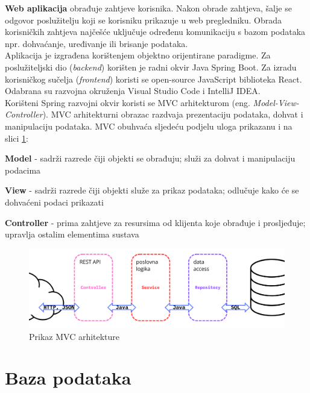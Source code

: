 		\textbf{Web aplikacija} obrađuje zahtjeve korisnika. Nakon obrade zahtjeva, šalje se odgovor poslužitelju koji se korisniku prikazuje u web pregledniku. Obrada korisničkih zahtjeva najčešće uključuje određenu komunikaciju s bazom podataka npr. dohvaćanje, uređivanje ili brisanje podataka. \\
		
				
		Aplikacija je izgrađena korištenjem objektno orijentirane paradigme. Za poslužiteljski dio (\textit{backend}) korišten je radni okvir Java Spring Boot. Za izradu korisničkog sučelja (\textit{frontend}) koristi se open-source JavaScript biblioteka React. Odabrana su razvojna okruženja Visual Studio Code i IntelliJ IDEA.\\
		 
		 
		\noindent Korišteni Spring razvojni okvir koristi se MVC arhitekturom (eng. \textit{Model-View-Controller}). MVC arhitekturni obrazac razdvaja prezentaciju podataka, dohvat i manipulaciju podataka. MVC obuhvaća sljedeću podjelu uloga prikazanu i na slici \ref{arh}:
		
		\begin{packed_item}
			\item \textbf{Model} - sadrži razrede čiji objekti se obrađuju; služi za dohvat i manipulaciju podacima
			\item \textbf{View} - sadrži razrede čiji objekti služe za prikaz podataka; odlučuje kako će se dohvaćeni podaci prikazati
			\item \textbf{Controller} - prima zahtjeve za resursima od klijenta koje
			obrađuje i prosljeđuje; upravlja ostalim elementima sustava
		\end{packed_item}
		
		
		\begin{figure}[H]
			\includegraphics[width=\textwidth]{slike/mvc-arh.PNG}
			\centering
			\caption{Prikaz MVC arhitekture}
			\label{arh}
		\end{figure}
		
		\newpage
		
		\section{Baza podataka}
			
